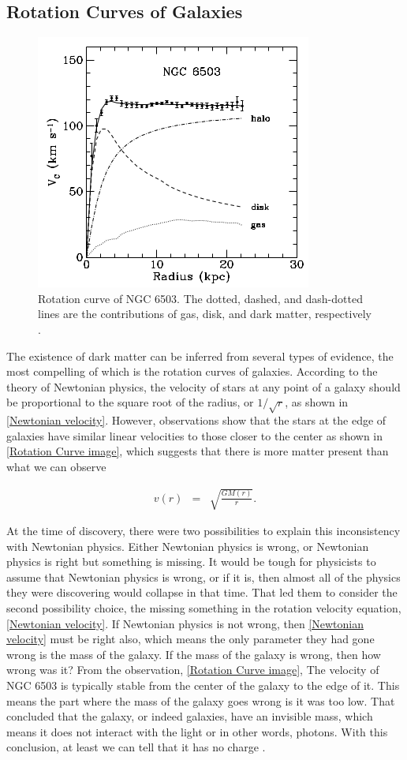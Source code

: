 \documentclass[10pt, oneside]{book}
\numberwithin{equation}{chapter}
\begin{document}
\subsection{Rotation Curves of Galaxies}
\begin{figure}[h]
    \centering
    \includegraphics[width=0.5\linewidth]{images/Rotation Curve.png}
    \caption{Rotation curve of NGC 6503. The dotted, dashed, and dash-dotted lines are the contributions of gas, disk, and dark matter, respectively \cite{Bertone_2005}.}
    \label{Rotation Curve image}
\end{figure}
The existence of dark matter can be inferred from several types of evidence, the most compelling of which is the rotation curves of galaxies. According to the theory of Newtonian physics, the velocity of stars at any point of a galaxy should be proportional to the square root of the radius, or $1/\sqrt{r}$, as shown in \autoref{Newtonian velocity}. However, observations show that the stars at the edge of galaxies have similar linear velocities to those closer to the center as shown in \autoref{Rotation Curve image}, which suggests that there is more matter present than what we can observe

\begin{eqnarray}\label{Newtonian velocity}
    v(r) &=& \sqrt{\frac{GM(r)}{r}}.
\end{eqnarray}

At the time of discovery, there were two possibilities to explain this inconsistency with Newtonian physics. Either Newtonian physics is wrong, or Newtonian physics is right but something is missing. It would be tough for physicists to assume that Newtonian physics is wrong, or if it is, then almost all of the physics they were discovering would collapse in that time. That led them to consider the second possibility choice, the missing something in the rotation velocity equation, \autoref{Newtonian velocity}. If Newtonian physics is not wrong, then \autoref{Newtonian velocity} must be right also, which means the only parameter they had gone wrong is the mass of the galaxy. If the mass of the galaxy is wrong, then how wrong was it? From the observation, \autoref{Rotation Curve image}, The velocity of NGC 6503 is typically stable from the center of the galaxy to the edge of it. This means the part where the mass of the galaxy goes wrong is it was too low. That concluded that the galaxy, or indeed galaxies, have an invisible mass, which means it does not interact with the light or in other words, photons. With this conclusion, at least we can tell that it has no charge \cite{Bertone_2005}.
\end{document}
